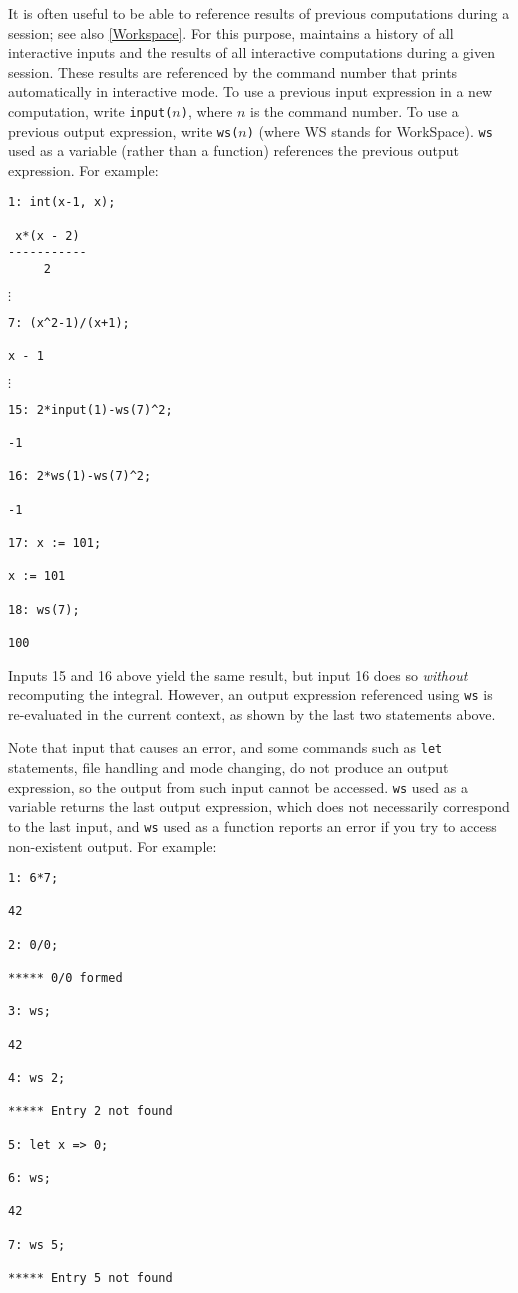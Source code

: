 \hypertarget{reserved:INPUT}{}
\hypertarget{reserved:WS}{}
It is often useful to be able to reference results of previous
computations during a {\REDUCE} session; see also \ref{Workspace}.
For this purpose, {\REDUCE} maintains a history of all
interactive inputs and the results of all interactive computations
during a given session.  These results are referenced by the command
number that {\REDUCE} prints automatically in interactive mode.  To
use a previous input expression in a new computation, write
\texttt{input(}$n$\texttt{)}, where $n$ is the command
number.  To use a previous output expression, write
\texttt{ws(}$n$\texttt{)} (where WS stands for WorkSpace).
\texttt{ws} used as a variable (rather than a function) references the
previous output expression.  For example:
\begin{verbatim}
1: int(x-1, x);

 x*(x - 2)
-----------
     2
\end{verbatim}
\(\vdots\)
\begin{verbatim}
7: (x^2-1)/(x+1);

x - 1
\end{verbatim}
\(\vdots\)
\begin{verbatim}
15: 2*input(1)-ws(7)^2;

-1

16: 2*ws(1)-ws(7)^2;

-1

17: x := 101;

x := 101

18: ws(7);

100
\end{verbatim}
Inputs 15 and 16 above yield the same result, but input 16 does so
\emph{without} recomputing the integral.  However, an output
expression referenced using \texttt{ws} is re-evaluated in the current
context, as shown by the last two statements above.

Note that input that causes an error, and some commands such as
\texttt{let} statements, file handling and mode changing, do not
produce an output expression, so the output from such input cannot be
accessed.  \texttt{ws} used as a variable returns the last output
expression, which does not necessarily correspond to the last input,
and \texttt{ws} used as a function reports an error if you try to
access non-existent output.  For example:
\begin{verbatim}
1: 6*7;

42

2: 0/0;

***** 0/0 formed

3: ws;

42

4: ws 2;

***** Entry 2 not found

5: let x => 0;

6: ws;

42

7: ws 5;

***** Entry 5 not found
\end{verbatim}

